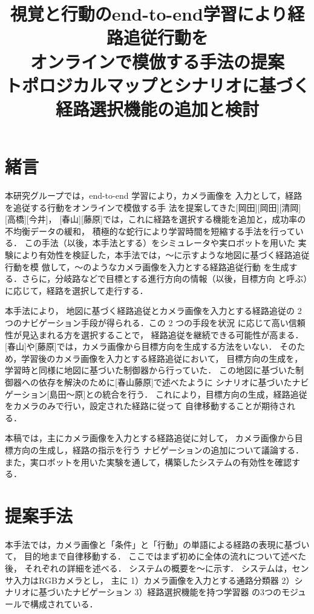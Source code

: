 \documentclass{sice-si}
\title{視覚と行動のend-to-end学習により経路追従行動を\\
オンラインで模倣する手法の提案\\
トポロジカルマップとシナリオに基づく経路選択機能の追加と検討\\} %
\begin{document}

\maketitle

\section{緒言}

本研究グループでは，end-to-end 学習により，カメラ画像を
入力として，経路を追従する行動をオンラインで模倣する手
法を提案してきた[岡田][岡田][清岡][高橋][今井]，
[春山][藤原]では，これに経路を選択する機能を追加と，成功率の不均衡データの緩和，
積極的な蛇行により学習時間を短縮する手法を行っている．
この手法（以後，本手法とする）をシミュレータや実ロボットを用いた
実験により有効性を検証した，本手法では，〜に示すような地図に基づく経路追従行動を模
倣して，〜のようなカメラ画像を入力とする経路追従行動
を生成する．さらに，分岐路などで目標とする進行方向の情報（以後，目標方向
と呼ぶ）に応じて，経路を選択して走行する．\par
本手法により，
地図に基づく経路追従とカメラ画像を入力とする経路追従の
2 つのナビゲーション手段が得られる．この 2 つの手段を状況
に応じて高い信頼性が見込まれる方を選択することで，
経路追従を継続できる可能性が高まる．
[春山]や[藤原]では，カメラ画像から目標方向を生成する方法をいない．
そのため，学習後のカメラ画像を入力とする経路追従において，
目標方向の生成を，学習時と同様に地図に基づいた制御器から行っていた．
この地図に基づいた制御器への依存を解決のために[春山藤原]で述べたように
シナリオに基づいたナビゲーション[島田〜原]との統合を行う．
これにより，目標方向の生成，経路追従をカメラのみで行い，設定された経路に従って
自律移動することが期待される．
\par
本稿では，主にカメラ画像を入力とする経路追従に対して，
カメラ画像から目標方向の生成し，経路の指示を行う
ナビゲーションの追加について議論する．
また，実ロボットを用いた実験を通して，構築したシステムの有効性を確認する．

\section{提案手法}
本手法では，カメラ画像と「条件」と「行動」の単語による経路の表現に基づいて，
目的地まで自律移動する．
ここではまず初めに全体の流れについて述べた後，
それぞれの詳細を述べる．
システムの概要を〜に示す．
システムは，センサ入力はRGBカメラとし，
主に
1）カメラ画像を入力とする通路分類器
2）シナリオに基づいたナビゲーション
3）経路選択機能を持つ学習器
の3つのモジュールで構成されている．
\end{document}
